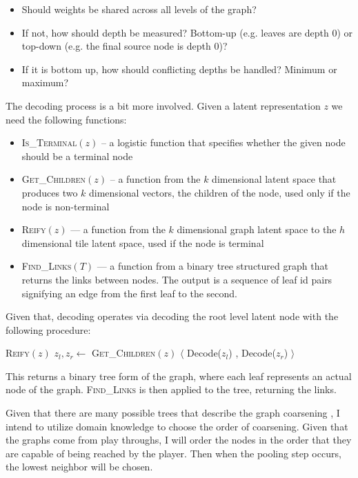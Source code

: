 \documentclass[a4paper]{article}
\begin{document}
\begin{itemize}
\item Should weights be shared across all levels of the graph?
\item If not, how should depth be measured? Bottom-up (e.g. leaves are depth 0) or top-down (e.g. the final source node is depth 0)? 
\item If it is bottom up, how should conflicting depths be handled? Minimum or maximum?
\end{itemize}

The decoding process is a bit more involved.  Given a latent representation $z$ we need the following functions:

\begin{itemize}
\item \textsc{Is\_Terminal}$(z)$ -- a logistic function that specifies whether the given node should be a terminal node
\item \textsc{Get\_Children}$(z)$ -- a function from the $k$ dimensional latent space that produces two $k$ dimensional vectors, the children of the node, used only if the node is non-terminal
\item \textsc{Reify}$(z)$ --- a function from the $k$ dimensional graph latent space to the $h$ dimensional tile latent space, used if the node is terminal

\item \textsc{Find\_Links}$(T)$ --- a function from a binary tree structured graph that returns the links between nodes.  The output is a sequence of leaf id pairs signifying an edge from the first leaf to the second. 
\end{itemize}

Given that, decoding operates via decoding the root level latent node with the following procedure:


\begin{algorithmic}[1]
\State \Return \textsc{Reify}$(z)$
\Else 
\State $z_{l}, z_{r} \gets $  \textsc{Get\_Children}$(z)$
\State \Return $\langle$ Decode($z_l$) ,  Decode($z_r$) $\rangle$ 
\EndIf
\EndProcedure
\end{algorithmic}

This returns a binary tree form of the graph, where each leaf represents an actual node of the graph.   \textsc{Find\_Links} is then applied to the tree, returning the links.

Given that there are many possible trees that describe the graph coarsening \cite{Comparisonofcoarseningschemesformultilevelgraphpartitioning}, I intend to utilize domain knowledge to choose the order of coarsening.  Given that the graphs come from play throughs, I will order the nodes in the order that they are capable of being reached by the player.  Then when the pooling step occurs, the lowest neighbor will be chosen.
\end{document}
